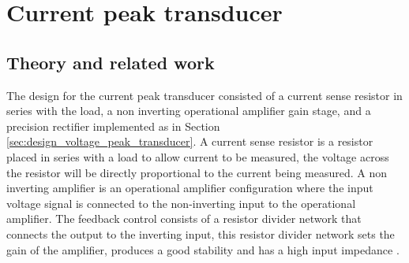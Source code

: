 \chapter{Current peak transducer}
\section{Theory and related work} \label{sec:literature_current_peak_transducer}
The design for the current peak transducer consisted of a current sense resistor in series with the load, a non inverting operational amplifier gain stage, and a precision rectifier implemented as in Section \ref{sec:design_voltage_peak_transducer}. A current sense resistor is a resistor placed in series with a load to allow current to be measured, the voltage across the resistor will be directly proportional to the current being measured.
A non inverting amplifier is an operational amplifier configuration where the input voltage signal is connected to the non-inverting input to the operational amplifier. The feedback control consists of a resistor divider network that connects the output to the inverting input, this resistor divider network sets the gain of the amplifier, produces a good stability and has a high input impedance \cite{NonInvertingOpAmp}. 

